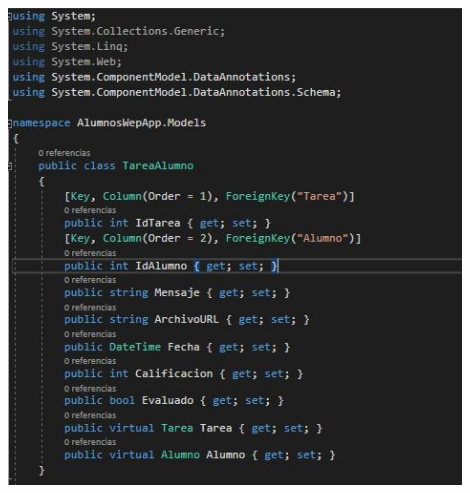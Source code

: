 \begin{flushleft}
\begin{itemize}
\begin{center}
	\includegraphics[width=12cm]{./Imagenes/paso5} 
	\end{center}


\end{itemize}
\end{flushleft}
